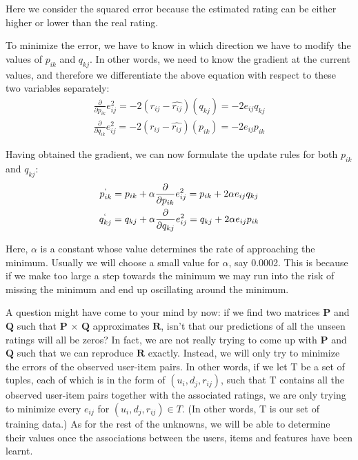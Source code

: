  Here we consider the squared error because the estimated rating can be either higher or lower than the real rating.

 To minimize the error, we have to know in which direction we have to modify the values of $p_{ik}$ and $q_{kj}$. In other words, we need to know the gradient at the current values, and therefore we differentiate the above equation with respect to these two variables separately:
	\begin{gather*}
      \frac{\partial}{\partial p_{ik}}e_{ij}^2 = -2(r_{ij} - \widehat{r_{ij}})(q_{kj}) = -2e_{ij}q_{kj} \\
      \frac{\partial}{\partial q_{ik}}e_{ij}^2 = -2(r_{ij} - \widehat{r_{ij}})(p_{ik}) = -2e_{ij}p_{ik}
  \end{gather*}

 Having obtained the gradient, we can now formulate the update rules for both $p_{ik}$ and $q_{kj}$:
\begin{gather*}
      p^`_{ik} = p_{ik} + \alpha\frac{\partial}{\partial p_{ik}}e_{ij}^2 = p_{ik} + 2\alpha e_{ij}q_{kj} \\
      q^`_{kj} = q_{kj} + \alpha\frac{\partial}{\partial q_{kj}}e_{ij}^2 = q_{kj} + 2\alpha e_{ij}p_{ik}
  \end{gather*}

 Here, $\alpha$ is a constant whose value determines the rate of approaching the minimum. Usually we will choose a small value for $\alpha$, say 0.0002. This is because if we make too large a step towards the minimum we may run into the risk of missing the minimum and end up oscillating around the minimum.

 A question might have come to your mind by now: if we find two matrices $\mathbf{P}$ and $\mathbf{Q}$ such that $\mathbf{P}$ $\times$ $\mathbf{Q}$ approximates $\mathbf{R}$, isn’t that our predictions of all the unseen ratings will all be zeros? In fact, we are not really trying to come up with $\mathbf{P}$ and $\mathbf{Q}$ such that we can reproduce $\mathbf{R}$ exactly. Instead, we will only try to minimize the errors of the observed user-item pairs. In other words, if we let T be a set of tuples, each of which is in the form of $(u_i, d_j, r_{ij})$, such that T contains all the observed user-item pairs together with the associated ratings, we are only trying to minimize every $e_{ij}$ for $(u_i, d_j, r_{ij}) \in T$. (In other words, T is our set of training data.) As for the rest of the unknowns, we will be able to determine their values once the associations between the users, items and features have been learnt.


